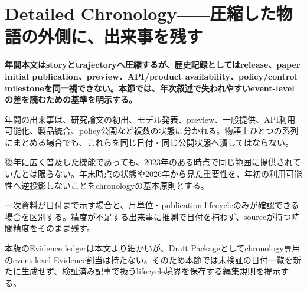 \section{Detailed Chronology――圧縮した物語の外側に、出来事を残す}
\noindent\textbf{年間本文はstoryとtrajectoryへ圧縮するが、歴史記録としてはrelease、paper initial publication、preview、API/product availability、policy/control milestoneを同一視できない。本節では、年次叙述で失われやすいevent-levelの差を読むための基準を明示する。}

年間の出来事は、研究論文の初出、モデル発表、preview、一般提供、API利用可能化、製品統合、policy公開など複数の状態に分かれる。物語上ひとつの系列にまとめる場合でも、これらを同じ日付・同じ公開状態へ潰してはならない。


後年に広く普及した機能であっても、2023年のある時点で同じ範囲に提供されていたとは限らない。年末時点の状態や2026年から見た重要性を、年初の利用可能性へ逆投影しないことをchronologyの基本原則とする。


一次資料が日付まで示す場合と、月単位・publication lifecycleのみが確認できる場合を区別する。精度が不足する出来事に推測で日付を補わず、sourceが持つ時間精度をそのまま残す。


本版のEvidence ledgerは本文より細かいが、Draft Packageとしてchronology専用のevent-level Evidence割当は持たない。そのため本節では未検証の日付一覧を新たに生成せず、検証済み記事で扱うlifecycle境界を保存する編集規則を提示する。
